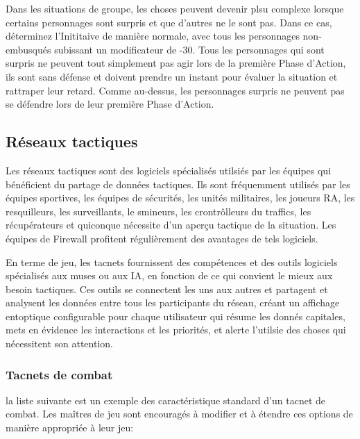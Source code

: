 Dans les situations de groupe, les choses peuvent devenir plsu complexe lorsque certains personnages sont surpris et que d'autres ne le sont pas. Dans ce cas, déterminez l'Inititaive de manière normale, avec tous les personnages non-embusqués subissant un modificateur de -30. Tous les personnages qui sont surpris ne peuvent tout simplement pas agir lors de la première Phase d'Action, ils sont sans défense et doivent prendre un instant pour évaluer la situation et rattraper leur retard. Comme au-dessus, les personnages surpris ne peuvent pas se défendre lors de leur première Phase d'Action. 

\subsection{Réseaux tactiques} \label{sec:tactical-networks} 

Les réseaux tactiques sont des logiciels spécialisés utilsiés par les équipes qui bénéficient du partage de données tactiques. Ils sont fréquemment utilisés par les équipes sportives, les équipes de sécurités, les unités militaires, les joueurs RA, les resquilleurs, les surveillants, le smineurs, les crontrôlleurs du traffics, les récupérateurs et quiconque nécessite d'un aperçu tactique de la situation. Les équipes de Firewall profitent régulièrement des avantages de tels logiciels. 

En terme de jeu, les tacnets fournissent des compétences et des outils logiciels spécialisés aux muses ou aux IA, en fonction de ce qui convient le mieux aux besoin tactiques. Ces outils se connectent les uns aux autres et partagent et analysent les données entre tous les participants du réseau, créant un affichage entoptique configurable pour chaque utilisateur qui résume les donnés capitales, mets en évidence les interactions et les priorités, et alerte l'utilsie des choses qui nécessitent son attention. 

\subsubsection{Tacnets de combat} la liste suivante est un exemple des caractéristique standard d'un tacnet de combat. Les maîtres de jeu sont encouragés à modifier et à étendre ces options de manière appropriée à leur jeu: 

